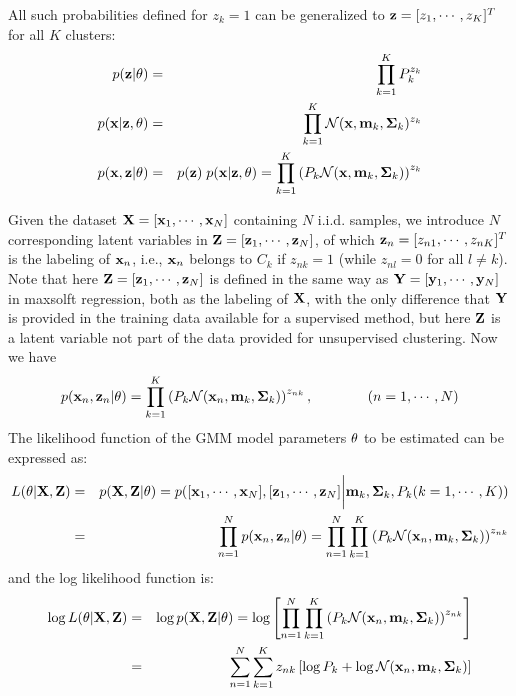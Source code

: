 \documentclass{article}
\begin{document}
All such probabilities defined for $z_k=1$ can be generalized to 
${\bf z}=[z_1,\cdots,z_K]^T$ for all $K$ clusters:
\begin{eqnarray}
  p({\bf z}|{\bf\theta})&=&\prod_{k=1}^K P_k^{z_k} \\
  p({\bf x}|{\bf z},{\bf\theta})&=&
  \prod_{k=1}^K {\cal N}({\bf x},{\bf m}_k,{\bf\Sigma}_k)^{z_k} \\
  p({\bf x},{\bf z}|{\bf\theta})&=&p({\bf z})\;p({\bf x}|{\bf z},\theta)
  =\prod_{k=1}^K \left(P_k {\cal N}({\bf x},{\bf m}_k,{\bf\Sigma}_k)\right)^{z_k}
\end{eqnarray}

Given the dataset ${\bf X}=[{\bf x}_1,\cdots,{\bf x}_N]$ containing
$N$ i.i.d. samples, we introduce $N$ corresponding latent variables 
in ${\bf Z}=[{\bf z}_1,\cdots,{\bf z}_N]$, of which 
${\bf z}_n=[z_{n1},\cdots,z_{nK}]^T$ is the labeling of ${\bf x}_n$,
i.e., ${\bf x}_n$ belongs to $C_k$ if $z_{nk}=1$ (while $z_{nl}=0$
for all $l\ne k$). Note that here ${\bf Z}=[{\bf z}_1,\cdots,{\bf z}_N]$
is defined in the same way as ${\bf Y}=[{\bf y}_1,\cdots,{\bf y}_N]$ 
in maxsolft regression, both as the labeling of ${\bf X}$, with the 
only difference that ${\bf Y}$ is provided in the training data available
for a supervised method, but here ${\bf Z}$ is a latent variable not part
of the data provided for unsupervised clustering. Now we have 
\begin{equation}
  p({\bf x}_n,{\bf z}_n|\theta)=\prod_{k=1}^K 
  \left(P_k {\cal N}({\bf x}_n,{\bf m}_k,{\bf\Sigma}_k)\right)^{z_{nk}},
       \;\;\;\;\;\;\;\;\;\;\;\;\;\;(n=1,\cdots,N)
\end{equation}
The likelihood function of the GMM model parameters ${\bf\theta}$ to 
be estimated can be expressed as:
\begin{eqnarray}
  L(\theta|{\bf X},{\bf Z})&=&p({\bf X},{\bf Z}|\theta)
  =p([{\bf x}_1,\cdots,{\bf x}_N],[{\bf z}_1,\cdots,{\bf z}_N]\bigg|{\bf m}_k,{\bf\Sigma}_k,P_k(k=1,\cdots,K))
  \nonumber\\
  &=&\prod_{n=1}^N p({\bf x}_n,{\bf z}_n|\theta)
  =\prod_{n=1}^N \prod_{k=1}^K \left(P_k{\cal N}({\bf x}_n,{\bf m}_k,{\bf\Sigma}_k)\right)^{z_{nk}}
\end{eqnarray}
and the log likelihood function is:
\begin{eqnarray}
  \log L(\theta|{\bf X},{\bf Z})&=&\log p({\bf X},{\bf Z}|\theta)
  =\log \left[ \prod_{n=1}^N \prod_{k=1}^K 
    \left(P_k{\cal N}({\bf x}_n,{\bf m}_k,{\bf\Sigma}_k)\right)^{z_{nk}}\right]
  \nonumber\\
  &=& \sum_{n=1}^N \sum_{k=1}^K z_{nk}
  \left[\log P_k+\log {\cal N}({\bf x}_n,{\bf m}_k,{\bf\Sigma}_k)\right]
  \label{logL}
\end{eqnarray}
\end{document}
